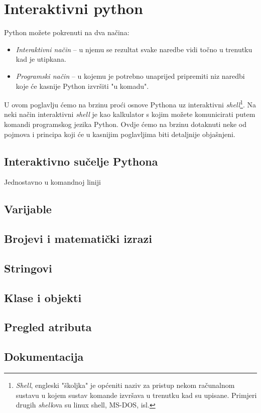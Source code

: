 \chapter{Interaktivni python}

Python možete pokrenuti na dva načina:

\begin{itemize}
	\item \emph{Interaktivni način} -- u njemu se rezultat svake naredbe vidi
		točno u trenutku kad je utipkana.
	\item \emph{Programski način} -- u kojemu je potrebno unaprijed pripremiti
		niz naredbi koje će kasnije Python izvršiti "u komadu".
\end{itemize}

U ovom poglavlju ćemo na brzinu proći osnove Pythona uz interaktivni
\emph{shell}\footnote{\emph{Shell}, engleski "školjka" je općeniti naziv za pristup
nekom računalnom sustavu u kojem sustav komande izvršava u trenutku kad su upisane.
Primjeri drugih \emph{shell}ova su linux shell, MS-DOS, isl.}. Na neki način
interaktivni \emph{shell} je kao kalkulator s kojim možete komunicirati putem komandi
programskog jezika Python. Ovdje ćemo na brzinu
dotaknuti neke od pojmova i principa koji će u kasnijim poglavljima biti detaljnije
objašnjeni.

\section{Interaktivno sučelje Pythona}

Jednostavno u komandnoj liniji 

\section{Varijable}

\section{Brojevi i matematički izrazi}

\section{Stringovi}

\section{Klase i objekti}

\section{Pregled atributa}

\section{Dokumentacija}
